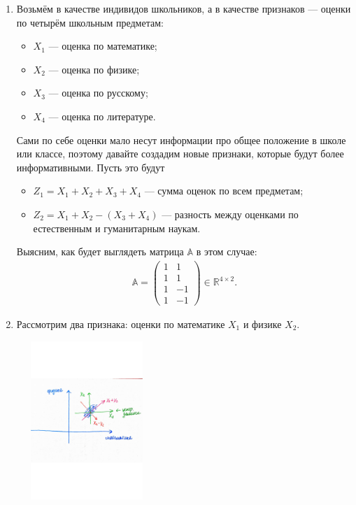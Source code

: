 \documentclass[specialist, 12pt,
subf, %
href, colorlinks=true,
substylefile = spbu.rtx,
]{disser}
\begin{document}
\begin{enumerate}
	\item Возьмём в качестве индивидов школьников, а в качестве признаков --- оценки по четырём школьным предметам:
	\begin{itemize}
		\item $X_1$ --- оценка по математике;
		\item $X_2$ --- оценка по физике;
		\item $X_3$ --- оценка по русскому;
		\item $X_4$ --- оценка по литературе.
	\end{itemize}
Сами по себе оценки мало несут информации про общее положение в школе или классе, поэтому давайте создадим новые признаки, которые будут более информативными. Пусть это будут
\begin{itemize}
	\item $Z_1 = X_1 + X_2 + X_3 + X_4$ --- сумма оценок по всем предметам;
	\item $Z_2 = X_1 + X_2 - (X_3 + X_4)$ --- разность между оценками по естественным и гуманитарным наукам.
\end{itemize}
Выясним, как будет выглядеть матрица $\mathbb{A}$ в этом случае:
\begin{gather*}
\mathbb{A} = \begin{pmatrix}
1 & 1\\
1 & 1\\
1 & -1\\
1 & -1
\end{pmatrix} \in \mathbb{R}^{4 \times 2}.
\end{gather*}

\item Рассмотрим два признака: оценки по математике $X_1$ и физике $X_2$.

	\begin{center}
	\begin{minipage}{0.51\linewidth}
		\centering
		\includegraphics[width=150pt, height=170pt]{p10}
		\label{10}
	\end{minipage}
\end{center}


\end{enumerate}
\end{document}
